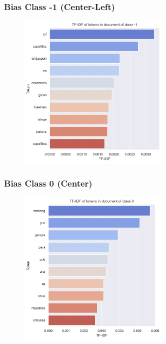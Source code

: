 \documentclass[11pt]{article}
\begin{document}
\pagebreak

\subsubsection{Bias Class -1 (Center-Left)}
\begin{center}


\TTTFIDFTable
\begin{figure}[h!]
  \includegraphics[width=0.65\textwidth]{figs/top_ten_tf_idf/tf_idf_token_-1.png}
\end{figure}
\end{center}

\pagebreak

\subsubsection{Bias Class 0 (Center)}
\begin{center}


\TTTFIDFTable
\begin{figure}[h!]
  \includegraphics[width=0.65\textwidth]{figs/top_ten_tf_idf/tf_idf_token_0.png}
\end{figure}
\end{center}
\end{document}
